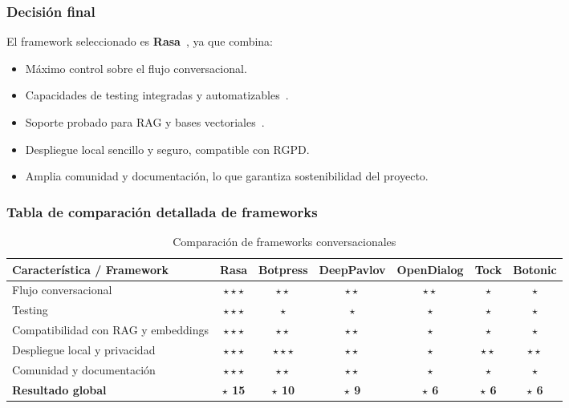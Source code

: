 \subsubsection{Decisión final}

El framework seleccionado es \textbf{Rasa}~\cite{rasadocs}, ya que combina:

\begin{itemize}
    \item Máximo control sobre el flujo conversacional.
    \item Capacidades de testing integradas y automatizables~\cite{bocklisch2020diet}.
    \item Soporte probado para RAG y bases vectoriales~\cite{lewis2020retrieval}.
    \item Despliegue local sencillo y seguro, compatible con RGPD.
    \item Amplia comunidad y documentación, lo que garantiza sostenibilidad del proyecto.
\end{itemize}

\subsubsection{Tabla de comparación detallada de frameworks}

\begin{table}[h]
\centering
\scriptsize
\begin{tabular}{|l|c|c|c|c|c|c|}
\hline
\textbf{Característica / Framework} & \textbf{Rasa} & \textbf{Botpress} & \textbf{DeepPavlov} & \textbf{OpenDialog} & \textbf{Tock} & \textbf{Botonic} \\ \hline
Flujo conversacional & $\star\star\star$ & $\star\star$ & $\star\star$ & $\star\star$ & $\star$ & $\star$ \\ \hline
Testing & $\star\star\star$ & $\star$ & $\star$ & $\star$ & $\star$ & $\star$ \\ \hline
Compatibilidad con RAG y embeddings & $\star\star\star$ & $\star\star$ & $\star\star$ & $\star$ & $\star$ & $\star$ \\ \hline
Despliegue local y privacidad & $\star\star\star$ & $\star\star\star$ & $\star\star$ & $\star$ & $\star\star$ & $\star\star$ \\ \hline
Comunidad y documentación & $\star\star\star$ & $\star\star$ & $\star\star$ & $\star$ & $\star$ & $\star$ \\ \hline
\textbf{Resultado global} & \textbf{$\star$ 15} & \textbf{$\star$ 10} & \textbf{$\star$ 9} & \textbf{$\star$ 6} & \textbf{$\star$ 6} & \textbf{$\star$ 6} \\ \hline
\end{tabular}
\caption{Comparación de frameworks conversacionales}
\label{tab:frameworks}
\end{table}

